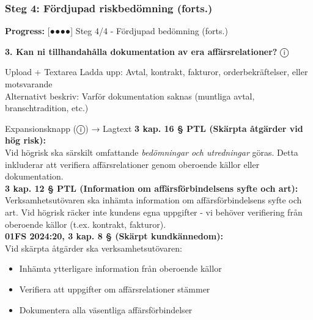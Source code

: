 \documentclass[10pt]{beamer}
\begin{document}
\begin{frame}[label=riskfragor-steg4-fortsattning]
  \frametitle{Steg 4: Fördjupad riskbedömning (forts.)}
  
  \small
  \textbf{Progress:} [●●●●] Steg 4/4 - Fördjupad bedömning (forts.)

  \vspace{0.4cm}

  \textbf{3. Kan ni tillhandahålla dokumentation av era affärsrelationer?} \hspace{0.3cm} ⓘ\\
  \begin{block}{Upload + Textarea}
    \tiny Ladda upp: Avtal, kontrakt, fakturor, orderbekräftelser, eller motsvarande\\
    \tiny Alternativt beskriv: Varför dokumentation saknas (muntliga avtal, branschtradition, etc.)
  \end{block}
  \begin{alertblock}{Expansionsknapp (ⓘ) → Lagtext}
    \tiny \textbf{3 kap. 16 § PTL (Skärpta åtgärder vid hög risk):}\\
    \tiny Vid högrisk ska särskilt omfattande \emph{bedömningar och utredningar} göras. Detta inkluderar att
    verifiera affärsrelationer genom oberoende källor eller dokumentation.\\[0.1cm]
    
    \tiny \textbf{3 kap. 12 § PTL (Information om affärsförbindelsens syfte och art):}\\
    \tiny Verksamhetsutövaren ska inhämta information om affärsförbindelsens syfte och art. Vid högrisk räcker
    inte kundens egna uppgifter - vi behöver verifiering från oberoende källor (t.ex. kontrakt, fakturor).\\[0.1cm]
    
    \tiny \textbf{01FS 2024:20, 3 kap. 8 § (Skärpt kundkännedom):}\\
    \tiny Vid skärpta åtgärder ska verksamhetsutövaren:
    \begin{itemize}
      \item Inhämta ytterligare information från oberoende källor
      \item Verifiera att uppgifter om affärsrelationer stämmer
      \item Dokumentera alla väsentliga affärsförbindelser
    \end{itemize}
    \vspace{0.1cm}
    

\end{alertblock}
\end{frame}
\end{document}

